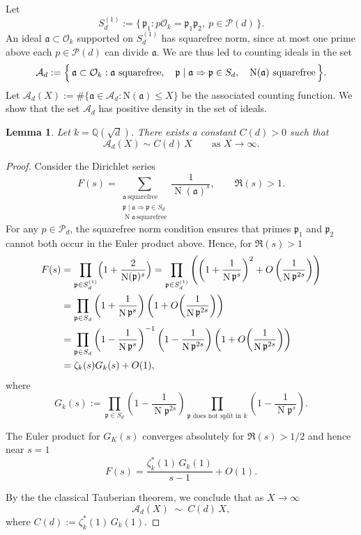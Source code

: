 \documentclass[11pt,reqno]{amsart}
\newcommand{\fa}{\mathfrak{a}}
\newcommand{\fp}{\mathfrak{p}}
\newcommand{\cA}{\mathcal{A}}
\newcommand{\cP}{\mathcal{P}}
\DeclareMathOperator{\Norm}{N}
\newtheorem{lemma}[theorem]{Lemma}
\theoremstyle{definition}
\theoremstyle{remark}
\begin{document}
\noindent
Let
$$
S_d^{(1)} := \{\, \mathfrak{p}_1 : p\mathcal{O}_k = \mathfrak{p}_1\mathfrak{p}_2,
\ p \in \mathcal{P}(d)\,\}.
$$
An ideal $\mathfrak{a} \subset \mathcal{O}_k$ supported on $S_d^{(1)}$ has 
squarefree norm, since at most one prime above each $p \in \mathcal{P}(d)$ 
can divide $\mathfrak{a}$. We are thus led to counting ideals in the set
\[
\mathcal{A}_d := \Bigl\{\, \mathfrak{a} \subset \mathcal{O}_k : 
\mathfrak{a}\ \text{squarefree},\quad
\mathfrak{p} \mid \mathfrak{a} \Rightarrow \mathfrak{p} \in S_d,\quad
\mathrm{N}(\mathfrak{a})\ \text{squarefree}\,\Bigr\}.
\]
Let $\cA_d(X) := \#\{\mathfrak{a} \in \mathcal{A}_d 
: \mathrm{N}(\mathfrak{a}) \leq X\}$ be the associated counting function. We show that the set $\cA_d$ has positive density in the set of ideals.
\begin{lemma}\label{counting_ideals_above_split_primes}
Let $k = \mathbb{Q}(\sqrt{d})$. There exists a constant $C(d) > 0$ such that
\[
\cA_d(X) \sim C(d)\, X \qquad \text{as } X \to \infty.
\]
\end{lemma}

\begin{proof}
    
Consider the Dirichlet series
\[
F(s)
   = \sum_{\substack{\fa\ \text{squarefree}\\ \fp\mid\fa\Rightarrow \fp\in S_d \\ \Norm\fa \ \text{squarefree}} }
     \frac{1}{\Norm(\fa)^s},
   \qquad \Re(s)>1.
\]
For any $p\in\cP_d$, the squarefree norm condition ensures that primes $\fp_1$ and $\fp_2$ cannot both occur in the Euler product above. Hence, for $\Re(s)>1$
\begin{align*}
F(s)&=\prod_{\fp\in S_d^{(1)}}\Bigl(1+\frac{2}{\Norm(\fp)^s}\Bigr) = \prod_{\fp \in S_d^{(1)}} 
\left(
\left(1 + \frac{1}{\Norm \fp^s}\right)^2 
+ O\left(\frac{1}{\Norm \fp^{2s}}\right)\right)\\
& =\prod_{\fp\in S_d}
    \left(1+\frac{1}{\Norm\fp^s}\right)
    \left( 1+O\!\left(\frac{1}{\Norm\fp^{2s}}\right)\right)\\
&=\prod_{\fp\in S_d}
     \left(1-\frac{1}{\Norm\fp^s}\right)^{-1} \left(1-\frac{1}{\Norm\fp^{2s}}\right)\left( 1+O\!\left(\frac{1}{\Norm\fp^{2s}}\right)\right)\\
&= \zeta_k(s) G_k(s) + O(1),
\end{align*}
where 
\begin{equation*}
    G_k(s):= \prod_{\fp\in S_d}  \left(1-\frac{1}{\Norm\fp^{2s}}\right) \prod_{\fp 
    \text{ does not split in }k} \left(1-\frac{1}{\Norm\fp^{s}}\right).
\end{equation*}

The Euler product for $G_K(s)$ converges absolutely for $\Re(s)>1/2$ and hence near $s=1$
\[
F(s)=\frac{\zeta^*_k(1)\,G_k(1)}{s-1} + O(1).
\]

\noindent
By the the classical Tauberian theorem, we conclude that as $X\to \infty$
\[
\cA_d(X)
\;\sim\;
C(d)\, X,
\]
where $C(d):= \zeta^*_k(1)\,G_k(1)$.
\end{proof}
\end{document}
